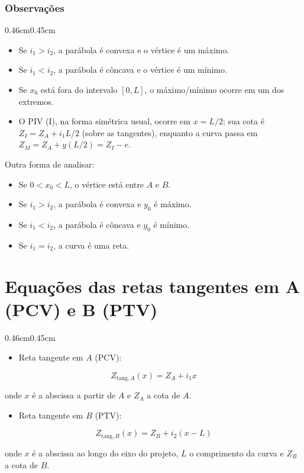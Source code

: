 \documentclass[12pt,letterpaper]{article}
\newenvironment{corpo}{\begin{adjustwidth}{0.46cm}{0.45cm}\justifying}{\end{adjustwidth}}
\begin{document}
\subsubsection*{Observações}

\begin{corpo}
\begin{itemize}
    \item Se $i_1>i_2$, a parábola é convexa e o vértice é um máximo.
    \item Se $i_1<i_2$, a parábola é côncava e o vértice é um mínimo.
    \item Se $x_0$ está fora do intervalo $[0,L]$, o máximo/mínimo ocorre em um dos extremos.
    \item O PIV (I), na forma simétrica usual, ocorre em $x=L/2$; sua cota é $Z_I=Z_A+i_1L/2$ (sobre as tangentes), enquanto a curva passa em $Z_M=Z_A+y(L/2)=Z_I-e$.
\end{itemize}

Outra forma de analisar:
\begin{itemize}
    \item Se $0<x_0<L$, o vértice está entre $A$ e $B$.
    \item Se $i_1>i_2$, a parábola é convexa e $y_0$ é máximo.
    \item Se $i_1<i_2$, a parábola é côncava e $y_0$ é mínimo.
    \item Se $i_1=i_2$, a curva é uma reta.
\end{itemize}
\end{corpo}

\section*{Equações das retas tangentes em A (PCV) e B (PTV)}

\begin{corpo}
\begin{itemize}
    \item Reta tangente em $A$ (PCV):
\end{itemize}
\[
 Z_{\mathrm{tang},A}(x)=Z_A+i_1x
\]

onde $x$ é a abscissa a partir de $A$ e $Z_A$ a cota de $A$.

\begin{itemize}
    \item Reta tangente em $B$ (PTV):
\end{itemize}
\[
 Z_{\mathrm{tang},B}(x)=Z_B+i_2(x-L)
\]

onde $x$ é a abscissa ao longo do eixo do projeto, $L$ o comprimento da curva e $Z_B$ a cota de $B$.
\end{corpo}
\end{document}
